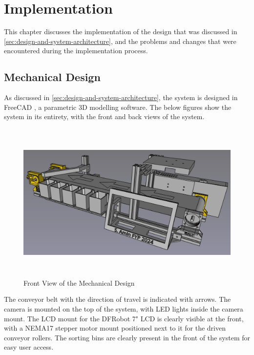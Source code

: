 \section{Implementation}
\label{sec:implementation}

This chapter discusses the implementation of the design that was discussed in \autoref{sec:design-and-system-architecture}, and the problems and changes that were encountered during the implementation process.

\subsection{Mechanical Design}
\label{sec:mechanical-design}
As discussed in \autoref{sec:design-and-system-architecture}, the system is designed in FreeCAD \cite{freecad}, a parametric 3D modelling software. The below figures show the system in its entirety, with the front and back views of the system.

\begin{figure}[H]
    \begin{minipage}[h]{0.95\textwidth}
        \centering
        \includegraphics[height=8cm]{imgs/freecad/wholefront.jpg}
        \caption{Front View of the Mechanical Design}
    \end{minipage}
\end{figure}

The conveyor belt with the direction of travel is indicated with arrows. The camera is mounted on the top of the system, with LED lights inside the camera mount. The LCD mount for the DFRobot 7" LCD is clearly visible at the front, with a NEMA17 stepper motor mount positioned next to it for the driven conveyor rollers. The sorting bins are clearly present in the front of the system for easy user access.

